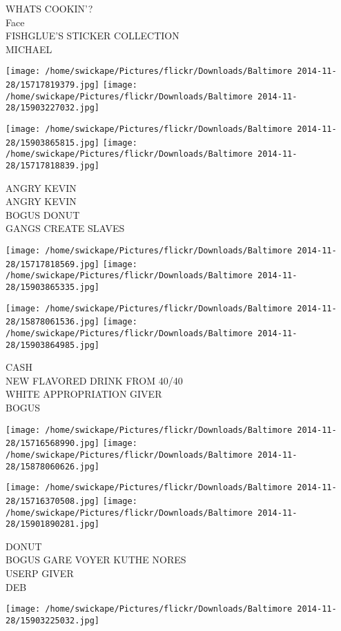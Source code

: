 \documentclass[10pt,letterpaper]{article}
\begin{document}
WHATS COOKIN'?\\
Face\\
FISHGLUE'S STICKER COLLECTION\\
MICHAEL
\pagebreak

\texttt{[image: /home/swickape/Pictures/flickr/Downloads/Baltimore 2014-11-28/15717819379.jpg]}
\texttt{[image: /home/swickape/Pictures/flickr/Downloads/Baltimore 2014-11-28/15903227032.jpg]}

\texttt{[image: /home/swickape/Pictures/flickr/Downloads/Baltimore 2014-11-28/15903865815.jpg]}
\texttt{[image: /home/swickape/Pictures/flickr/Downloads/Baltimore 2014-11-28/15717818839.jpg]}

ANGRY KEVIN\\
ANGRY KEVIN\\
BOGUS DONUT\\
GANGS CREATE SLAVES
\pagebreak

\texttt{[image: /home/swickape/Pictures/flickr/Downloads/Baltimore 2014-11-28/15717818569.jpg]}
\texttt{[image: /home/swickape/Pictures/flickr/Downloads/Baltimore 2014-11-28/15903865335.jpg]}

\texttt{[image: /home/swickape/Pictures/flickr/Downloads/Baltimore 2014-11-28/15878061536.jpg]}
\texttt{[image: /home/swickape/Pictures/flickr/Downloads/Baltimore 2014-11-28/15903864985.jpg]}

CASH\\
NEW FLAVORED DRINK FROM 40/40\\
WHITE APPROPRIATION GIVER\\
BOGUS
\pagebreak

\texttt{[image: /home/swickape/Pictures/flickr/Downloads/Baltimore 2014-11-28/15716568990.jpg]}
\texttt{[image: /home/swickape/Pictures/flickr/Downloads/Baltimore 2014-11-28/15878060626.jpg]}

\texttt{[image: /home/swickape/Pictures/flickr/Downloads/Baltimore 2014-11-28/15716370508.jpg]}
\texttt{[image: /home/swickape/Pictures/flickr/Downloads/Baltimore 2014-11-28/15901890281.jpg]}

DONUT\\
BOGUS GARE VOYER KUTHE NORES\\
USERP GIVER\\
DEB
\pagebreak

\texttt{[image: /home/swickape/Pictures/flickr/Downloads/Baltimore 2014-11-28/15903225032.jpg]}
\end{document}
